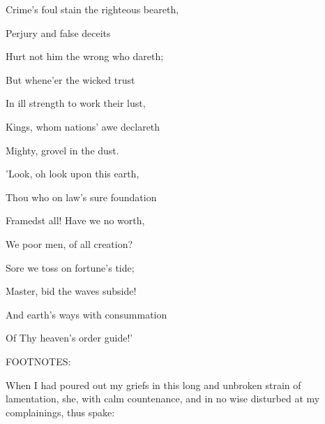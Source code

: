 Crime's foul stain the righteous beareth,

Perjury and false deceits

Hurt not him the wrong who dareth;

But whene'er the wicked trust

In ill strength to work their lust,

Kings, whom nations' awe declareth

Mighty, grovel in the dust.

'Look, oh look upon this earth,

Thou who on law's sure foundation

Framedst all! Have we no worth,

We poor men, of all creation?

Sore we toss on fortune's tide;

Master, bid the waves subside!

And earth's ways with consummation

Of Thy heaven's order guide!'

FOOTNOTES:


When I had poured out my griefs in this long and unbroken strain of
lamentation, she, with calm countenance, and in no wise disturbed at my
complainings, thus spake:

